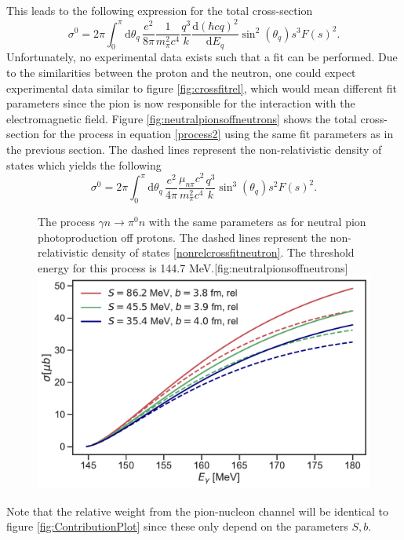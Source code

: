 This leads to the following expression for the total cross-section
\begin{equation} \label{pionneutraloffneutron}
	\sigma^0 = 2\pi \int_0^\pi \text{d}\theta_q \, \frac{e^2}{8\pi}\frac{1}{m_\pi^2c^4}\frac{q^3}{k}\frac{\text{d}(\hbar c q)^2}{\text{d}E_q}\sin^2(\theta_q) s^3 F(s)^2.
\end{equation}
Unfortunately, no experimental data exists such that a fit can be performed. Due to the similarities between the proton and the neutron, one could expect experimental data similar to figure \ref{fig:crossfitrel}, which would mean different fit parameters since the pion is now responsible for the interaction with the electromagnetic field. Figure \ref{fig:neutralpionsoffneutrons} shows the total cross-section for the process in equation \eqref{process2} using the same fit parameters as in the previous section. The dashed lines represent the non-relativistic density of states which yields the following 
\begin{equation} \label{nonrelcrossfitneutron}
	\sigma^0 = 2\pi \int_0^\pi \text{d}\theta_q \, \frac{e^2}{4\pi}\frac{\mu_{n\pi}c^2}{m_\pi^2 c^4}\frac{q^3}{k}\sin^3(\theta_q)s^2 F(s)^2.
\end{equation} 
\begin{figure}[H]
	\begin{sidecaption}{The process $\gamma n \rightarrow \pi^0 n$ with the same parameters as for neutral pion photoproduction off protons. The dashed lines represent the non-relativistic density of states \eqref{nonrelcrossfitneutron}. The threshold energy for this process is 144.7 MeV.}[fig:neutralpionsoffneutrons]
		\includegraphics[width=\linewidth]{Figures/NeutralPionsOffNeutrons.pdf}
	\end{sidecaption}
\end{figure}
Note that the relative weight from the pion-nucleon channel will be identical to figure \ref{fig:ContributionPlot} since these only depend on the parameters $S,b$. 
